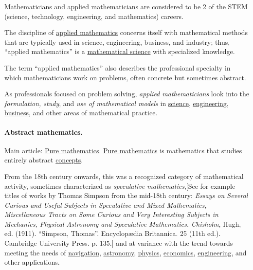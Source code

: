 \documentclass{article}
\begin{document}
Mathematicians and applied mathematicians are considered to be 2 of the STEM (science, technology, engineering, and mathematics) careers.

%
The discipline of \href{https://en.wikipedia.org/wiki/Applied_mathematics}{applied mathematics} concerns itself with mathematical methods that are typically used in science, engineering, business, and industry; thus, ``applied mathematics'' is a \href{https://en.wikipedia.org/wiki/Mathematical_science}{mathematical science} with specialized knowledge.

The term ``applied mathematics'' also describes the professional specialty in which mathematicians work on problems, often concrete but sometimes abstract.

As professionals focused on problem solving, \textit{applied mathematicians} look into the \textit{formulation, study}, and \textit{use of mathematical models} in \href{https://en.wikipedia.org/wiki/Science}{science}, \href{https://en.wikipedia.org/wiki/Engineering}{engineering}, \href{https://en.wikipedia.org/wiki/Business}{business}, and other areas of mathematical practice.

\paragraph{Abstract mathematics.} Main article: \href{https://en.wikipedia.org/wiki/Pure_mathematics}{Pure mathematics}. \href{https://en.wikipedia.org/wiki/Pure_mathematics}{Pure mathematics} is mathematics that studies entirely abstract \href{https://en.wikipedia.org/wiki/Concept}{concepts}.

From the 18th century onwards, this was a recognized category of mathematical activity, sometimes characterized as \textit{speculative mathematics},[See for example titles of works by Thomas Simpson from the mid-18th century: \textit{Essays on Several Curious and Useful Subjects in Speculative and Mixed Mathematics, Miscellaneous Tracts on Some Curious and Very Interesting Subjects in Mechanics, Physical Astronomy and Speculative Mathematics. Chisholm}, Hugh, ed. (1911). ``Simpson, Thomas''. Encyclop\ae dia Britannica. 25 (11th ed.). Cambridge University Press. p. 135.] and at variance with the trend towards meeting the needs of \href{https://en.wikipedia.org/wiki/Navigation}{navigation}, \href{https://en.wikipedia.org/wiki/Astronomy}{astronomy}, \href{https://en.wikipedia.org/wiki/Physics}{physics}, \href{https://en.wikipedia.org/wiki/Economics}{economics}, \href{https://en.wikipedia.org/wiki/Engineering}{engineering}, and other applications.
\end{document}
